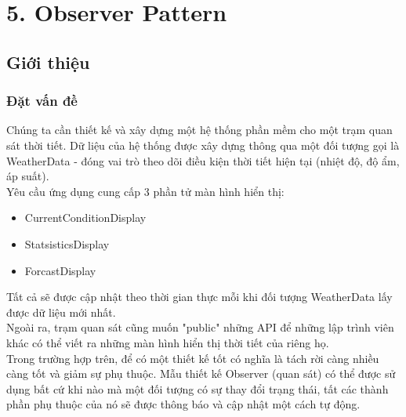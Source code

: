 \chapter{5. Observer Pattern}

\section{Giới thiệu}
\subsection{Đặt vấn đề}
Chúng ta cần thiết kế và xây dựng một hệ thống phần mềm cho một trạm quan sát thời tiết. Dữ liệu của hệ thống được xây dựng thông qua một đối tượng gọi là WeatherData - đóng vai trò theo dõi điều kiện thời tiết hiện tại (nhiệt độ, độ ẩm, áp suất).\\
Yêu cầu ứng dụng cung cấp 3 phần tử màn hình hiển thị:
\begin{itemize}
    \item CurrentConditionDisplay
    \item StatsisticsDisplay
    \item ForcastDisplay
\end{itemize}
Tất cả sẽ được cập nhật theo thời gian thực mỗi khi đối tượng WeatherData lấy được dữ liệu mới nhất.\\
Ngoài ra, trạm quan sát cũng muốn "public" những API để những lập trình viên khác có thể viết ra những màn hình hiển thị thời tiết của riêng họ.\\
Trong trường hợp trên, để có một thiết kế tốt có nghĩa là tách rời càng nhiều càng tốt và giảm sự phụ thuộc. Mẫu thiết kế Observer (quan sát) có thể được sử dụng bất cứ khi nào mà một đối tượng có sự thay đổi trạng thái, tất các thành phần phụ thuộc của nó sẽ được thông báo và cập nhật một cách tự động.
